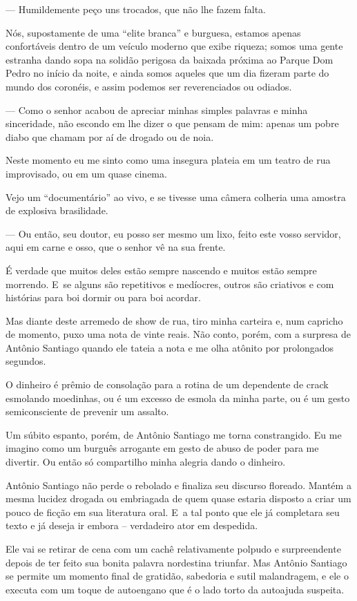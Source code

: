 — Humildemente peço uns trocados, que não lhe fazem falta.

Nós, supostamente de uma ``elite branca'' e burguesa, estamos apenas
confortáveis dentro de um veículo moderno que exibe riqueza; somos uma
gente estranha dando sopa na solidão perigosa da baixada próxima ao
Parque Dom Pedro no início da noite, e ainda somos aqueles que um dia
fizeram parte do mundo dos coronéis, e assim podemos ser reverenciados
ou odiados.

— Como o senhor acabou de apreciar minhas simples palavras e minha
sinceridade, não escondo em lhe dizer o que pensam de mim: apenas um
pobre diabo que chamam por aí de drogado ou de noia.

Neste momento eu me sinto como uma insegura plateia em um teatro de rua
improvisado, ou em um quase cinema.

Vejo um ``documentário'' ao vivo, e se tivesse uma câmera colheria uma
amostra de explosiva brasilidade.

— Ou então, seu doutor, eu posso ser mesmo um lixo, feito este vosso
servidor, aqui em carne e osso, que o senhor vê na sua frente.

É verdade que muitos deles estão sempre nascendo e muitos estão sempre
morrendo. E~se alguns são repetitivos e medíocres, outros são criativos
e com histórias para boi dormir ou para boi acordar.

Mas diante deste arremedo de show de rua, tiro minha carteira e, num
capricho de momento, puxo uma nota de vinte reais. Não conto, porém, com
a surpresa de Antônio Santiago quando ele tateia a nota e me olha
atônito por prolongados segundos.

O dinheiro é prêmio de consolação para a rotina de um dependente de
crack esmolando moedinhas, ou é um excesso de esmola da minha parte, ou
é um gesto semiconsciente de prevenir um assalto.

Um súbito espanto, porém, de Antônio Santiago me torna constrangido. Eu
me imagino como um burguês arrogante em gesto de abuso de poder para me
divertir. Ou então só compartilho minha alegria dando o dinheiro.

Antônio Santiago não perde o rebolado e finaliza seu discurso floreado.
Mantém a mesma lucidez drogada ou embriagada de quem quase estaria
disposto a criar um pouco de ficção em sua literatura oral. E~a tal
ponto que ele já completara seu texto e já deseja ir embora --
verdadeiro ator em despedida.

\asterisc{}

Ele vai se retirar de cena com um cachê relativamente polpudo e
surpreendente depois de ter feito sua bonita palavra nordestina
triunfar. Mas Antônio Santiago se permite um momento final de gratidão,
sabedoria e sutil malandragem, e ele o executa com um toque de
autoengano que é o lado torto da autoajuda suspeita.

